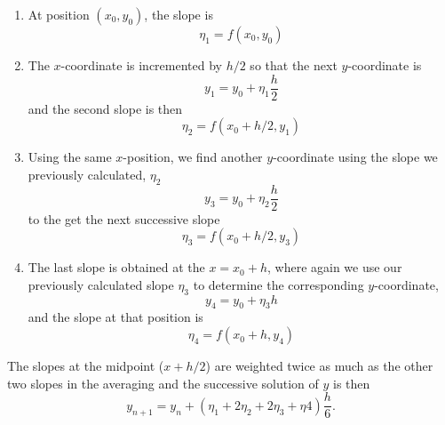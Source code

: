 \documentclass[12pt, manuscript]{article}
\begin{document}
    \begin{enumerate}
        \item
            At position $(x_0, y_0)$, the slope is 
            \begin{equation}\label{eq:slope1}
                \eta_1 = f(x_0, y_0)
            \end{equation}
        \item
            The $x$-coordinate is incremented by $h/2$ so that the next $y$-coordinate is 
            \begin{equation}
                y_1 = y_0 + \eta_1\frac{h}{2}
            \end{equation}
            and the second slope is then 
            \begin{equation}\label{eq:slope2}
                \eta_2 = f(x_0 + h/2, y_1)
            \end{equation}
        \item
            Using the same $x$-position, we find another $y$-coordinate using the slope we previously calculated, $\eta_2$
            \begin{equation}
                y_3 = y_0 + \eta_2\frac{h}{2}
            \end{equation}
            to the get the next successive slope
            \begin{equation}\label{eq:slope3}
                \eta_3 = f(x_0 + h/2, y_3)
            \end{equation}
        \item
            The last slope is obtained at the $x = x_0 + h$, where again we use our previously calculated slope $\eta_3$ to determine the corresponding $y$-coordinate,
            \begin{equation}
                y_4 = y_0 + \eta_3h
            \end{equation}
            and the slope at that position is
            \begin{equation}\label{eq:slope4}
                \eta_4 = f(x_0 + h, y_4)
            \end{equation}
    \end{enumerate}
        The slopes at the midpoint ($x+h/2$) are weighted twice as much as the other two slopes in the averaging and the successive solution of $y$ is then
            \begin{equation}
                y_{n+1} = y_n + \left(\eta_1+2\eta_2+2\eta_3+\eta4\right)\frac{h}{6}.
            \end{equation}
   
\end{document}
